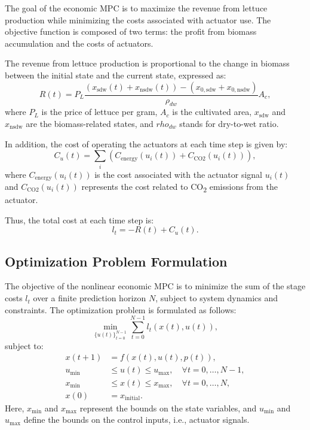 \documentclass[conference]{IEEEtran}
\begin{document}
The goal of the economic MPC is to maximize the revenue from lettuce production while minimizing the costs associated with actuator use. The objective function is composed of two terms: the profit from biomass accumulation and the costs of actuators.

The revenue from lettuce production is proportional to the change in biomass between the initial state and the current state, expressed as:
\begin{equation}
    R(t) = P_L  \frac{(x_{\mathrm{sdw}}(t) + x_{\mathrm{nsdw}}(t)) - (x_{0, \mathrm{sdw}} + x_{0, \mathrm{nsdw} })}{\rho_{dw}}  A_c,
\end{equation}
where \(P_L\) is the price of lettuce per gram, \(A_c\) is the cultivated area, \(x_{\mathrm{sdw}}\) and \(x_{\mathrm{nsdw}}\) are the biomass-related states, and \(rho_{dw}\) stands for dry-to-wet ratio.

In addition, the cost of operating the actuators at each time step is given by:
\begin{equation}
    C_u(t) = \sum_{i} \left( C_{\text{energy}}(u_i(t)) + C_{\text{CO2}}(u_i(t)) \right),
\end{equation}
where \(C_{\text{energy}}(u_i(t))\) is the cost associated with the actuator signal \(u_i(t)\) and \(C_{\text{CO2}}(u_i(t))\) represents the cost related to CO\textsubscript{2} emissions from the actuator.

Thus, the total cost at each time step is:
\begin{equation}
    l_t = -R(t) + C_u(t).
\end{equation}

\subsection{Optimization Problem Formulation}

The objective of the nonlinear economic MPC is to minimize the sum of the stage costs \(l_t\) over a finite prediction horizon \(N\), subject to system dynamics and constraints. The optimization problem is formulated as follows:
\begin{equation}
    \min_{{\{u(t)\}}_{t=0}^{N-1}} \sum_{t=0}^{N-1} l_t(x(t), u(t)),
\end{equation}
subject to:
\begin{align}
    x(t+1)   & = f(x(t), u(t), p(t)),                                    \\
    u_{\min} & \leq u(t) \leq u_{\max}, \quad \forall t = 0, \dots, N-1, \\
    x_{\min} & \leq x(t) \leq x_{\max}, \quad \forall t = 0, \dots, N,   \\
    x(0)     & = x_{\text{initial}}.
\end{align}
Here, \(x_{\min}\) and \(x_{\max}\) represent the bounds on the state variables, and \(u_{\min}\) and \(u_{\max}\) define the bounds on the control inputs, i.e., actuator signals.
\end{document}
